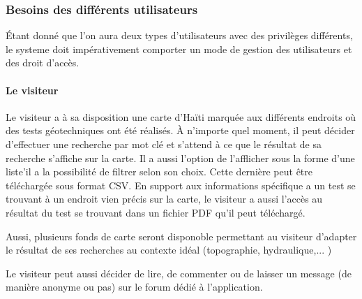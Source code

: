         \subsubsection{Besoins des différents utilisateurs}
        Étant donné que l'on aura deux types d'utilisateurs avec des privilèges différents,
        le systeme doit impérativement comporter un mode de gestion des utilisateurs et des droit d'accès.
        \paragraph{Le visiteur}
        Le visiteur a à sa disposition une carte d'Haïti marquée aux différents endroits où des tests 
        géotechniques ont été réalisés.
        À n'importe quel moment, il peut décider d'effectuer une recherche par mot clé et s'attend
        à ce que le résultat de sa recherche s'affiche sur la carte. Il a aussi l'option de l'afflicher sous la forme
        d'une liste'il a la possibilité de filtrer selon son choix. Cette dernière peut être téléchargée sous format CSV.
        En support aux informations spécifique a un test se trouvant à un endroit vien précis sur la carte,
        le visiteur a aussi l'accès au résultat du test se trouvant dans un fichier PDF qu'il peut téléchargé.
        \par
        Aussi, plusieurs fonds de carte seront disponoble permettant au visiteur d'adapter le résultat de ses recherches
        au contexte idéal (topographie, hydraulique,... )
        \par
        Le visiteur peut aussi décider de lire, de commenter ou de laisser un message (de manière anonyme ou pas) sur le forum dédié à l'application.
